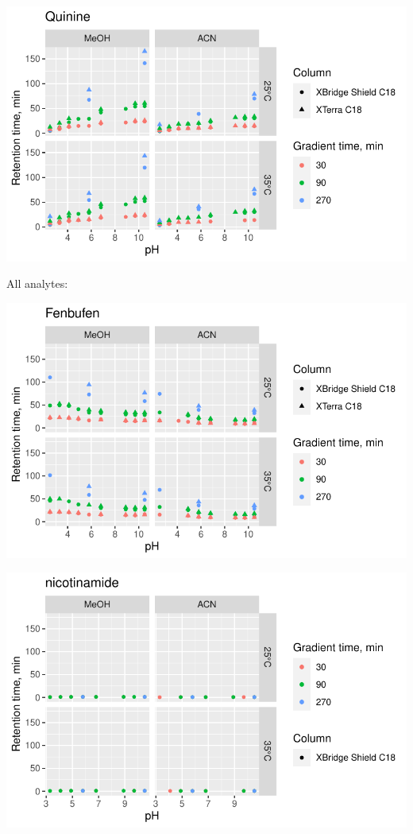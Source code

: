 \documentclass[
  letterpaper,
  DIV=11,
  numbers=noendperiod]{scrreprt}
\begin{document}
\includegraphics{index_files/figure-pdf/unnamed-chunk-3-6.pdf}

All analytes:

\includegraphics{index_files/figure-pdf/unnamed-chunk-4-1.pdf}

\includegraphics{index_files/figure-pdf/unnamed-chunk-4-2.pdf}
\end{document}
